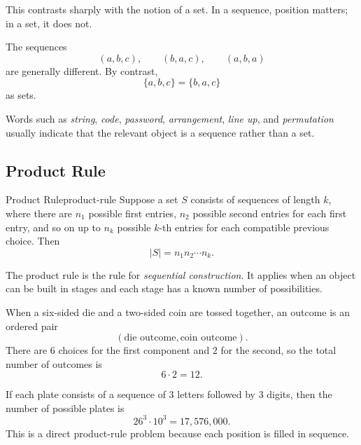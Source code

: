 This contrasts sharply with the notion of a set. In a sequence, position matters; in a set, it does not.

\begin{examplebox}[title={Basic contrast}]
The sequences
\[
(a,b,c),\qquad (b,a,c),\qquad (a,b,a)
\]
are generally different. By contrast,
\[
\{a,b,c\}=\{b,a,c\}
\]
as sets.
\end{examplebox}

\begin{examtip}[title={Recognition pattern}]
Words such as \emph{string}, \emph{code}, \emph{password}, \emph{arrangement}, \emph{line up}, and \emph{permutation} usually indicate that the relevant object is a sequence rather than a set.
\end{examtip}

\subsection{Product Rule}

\begin{theorem}{Product Rule}{product-rule}
Suppose a set $S$ consists of sequences of length $k$, where there are $n_1$ possible first entries, $n_2$ possible second entries for each first entry, and so on up to $n_k$ possible $k$-th entries for each compatible previous choice. Then
\[
|S|=n_1n_2\cdots n_k.
\]
\end{theorem}

The product rule is the rule for \emph{sequential construction}. It applies when an object can be built in stages and each stage has a known number of possibilities.

\begin{examplebox}[title={Die and coin}]
When a six-sided die and a two-sided coin are tossed together, an outcome is an ordered pair
\[
(\text{die outcome},\text{coin outcome}).
\]
There are $6$ choices for the first component and $2$ for the second, so the total number of outcomes is
\[
6\cdot 2=12.
\]
\end{examplebox}

\begin{examplebox}[title={License plates}]
If each plate consists of a sequence of $3$ letters followed by $3$ digits, then the number of possible plates is
\[
26^3\cdot 10^3=17{,}576{,}000.
\]
This is a direct product-rule problem because each position is filled in sequence.
\end{examplebox}

